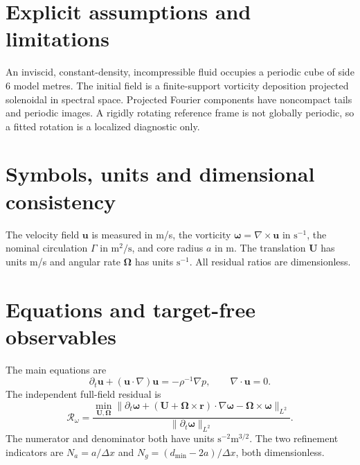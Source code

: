\documentclass[11pt,a4paper]{article}
\begin{document}

\section{Explicit assumptions and limitations}

An inviscid, constant-density, incompressible fluid occupies a periodic cube of side 6 model metres. The initial field is a finite-support vorticity deposition projected solenoidal in spectral space. Projected Fourier components have noncompact tails and periodic images. A rigidly rotating reference frame is not globally periodic, so a fitted rotation is a localized diagnostic only.


\section{Symbols, units and dimensional consistency}

The velocity field $\mathbf u$ is measured in m/s, the vorticity $\boldsymbol\omega=\nabla\times\mathbf u$ in $\mathrm{s}^{-1}$, the nominal circulation $\Gamma$ in $\mathrm{m}^2/\mathrm{s}$, and core radius $a$ in m. The translation $\mathbf U$ has units m/s and angular rate $\boldsymbol\Omega$ has units $\mathrm{s}^{-1}$. All residual ratios are dimensionless.


\section{Equations and target-free observables}

The main equations are
\begin{equation}
\partial_t\mathbf u+(\mathbf u\cdot\nabla)\mathbf u=-\rho^{-1}\nabla p,\qquad \nabla\cdot\mathbf u=0.
\end{equation}
The independent full-field residual is
\begin{equation}
\mathcal R_\omega=\frac{\min_{\mathbf U,\boldsymbol\Omega}\|\partial_t\boldsymbol\omega+(\mathbf U+\boldsymbol\Omega\times\mathbf r)\cdot\nabla\boldsymbol\omega-\boldsymbol\Omega\times\boldsymbol\omega\|_{L^2}}{\|\partial_t\boldsymbol\omega\|_{L^2}}.
\end{equation}
The numerator and denominator both have units $\mathrm{s}^{-2}\mathrm{m}^{3/2}$. The two refinement indicators are $N_a=a/\Delta x$ and $N_g=(d_{\min}-2a)/\Delta x$, both dimensionless.
\end{document}

